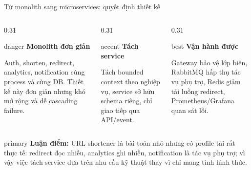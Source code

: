\documentclass[aspectratio=169]{beamer}
\begin{document}
\begin{frame}{Từ monolith sang microservices: quyết định thiết kế}
    \begin{columns}[T,onlytextwidth]
        \begin{column}{0.31\textwidth}
            \begin{claimbox}{danger}
                \centering\textbf{Monolith đơn giản}\par\small
                Auth, shorten, redirect, analytics, notification cùng process và cùng DB. Thiết kế này đơn giản nhưng khó mở rộng và dễ cascading failure.
            \end{claimbox}
        \end{column}
        \begin{column}{0.31\textwidth}
            \begin{claimbox}{accent}
                \centering\textbf{Tách service}\par\small
                Tách bounded context theo nghiệp vụ, service sở hữu schema riêng, chỉ giao tiếp qua API/event.
            \end{claimbox}
        \end{column}
        \begin{column}{0.31\textwidth}
            \begin{claimbox}{best}
                \centering\textbf{Vận hành được}\par\small
                Gateway bảo vệ lớp biên, RabbitMQ hấp thụ tác vụ phụ trợ, Redis giảm tải luồng redirect, Prometheus/Grafana quan sát lỗi.
            \end{claimbox}
        \end{column}
    \end{columns}
    \vspace{0.35cm}
    \begin{claimbox}{primary}
        \small \textbf{Luận điểm:} URL shortener là bài toán nhỏ nhưng có profile tải rất thực tế: redirect đọc nhiều, analytics ghi nhiều, notification là tác vụ phụ trợ; vì vậy việc tách service dựa trên nhu cầu kỹ thuật thay vì chỉ mang tính hình thức.
    \end{claimbox}
\end{frame}
\end{document}
